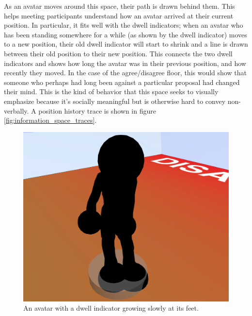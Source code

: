 As an avatar moves around this space, their path is drawn behind them. This helps meeting participants understand how an avatar arrived at their current position. In particular, it fits well with the dwell indicators; when an avatar who has been standing somewhere for a while (as shown by the dwell indicator) moves to a new position, their old dwell indicator will start to shrink and a line is drawn between their old position to their new position. This connects the two dwell indicators and shows how long the avatar was in their previous position, and how recently they moved. In the case of the agree/disagree floor, this would show that someone who perhaps had long been against a particular proposal had changed their mind. This is the kind of behavior that this space seeks to visually emphasize because it's socially meaningful but is otherwise hard to convey non-verbally. A position history trace is shown in figure \ref{fig:information_space_traces}.

\begin{figure}[tp]
	\includegraphics{figures/dwell-crop-lower.png}
	\caption{An avatar with a dwell indicator growing slowly at its feet.}
	\label{fig:information_space_dwell}
\end{figure}

